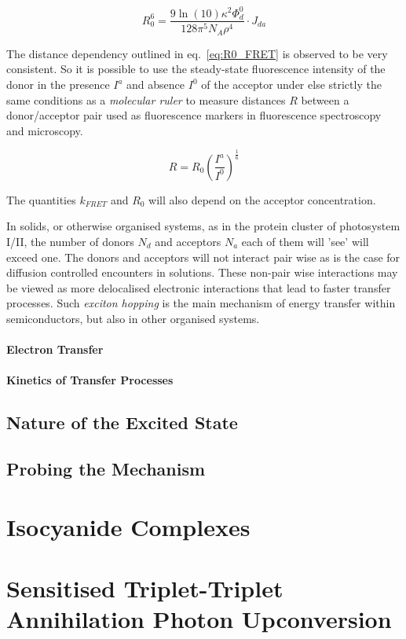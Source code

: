 			\begin{equation}
				\label{eq:R0_FRET}
				R^6_0 = \frac{9\ln(10)\kappa^2\Phi^0_d}{128\pi^5 N_A\rho^4}\cdot J_{da}
			\end{equation}

			The distance dependency outlined in eq.~\ref{eq:R0_FRET} is observed to be very consistent. So it is possible to use the steady-state fluorescence intensity of the donor in the presence $I^a$ and absence $I^0$ of the acceptor under else strictly the same conditions as a \emph{molecular ruler} to measure distances $R$ between a donor/acceptor pair used as fluorescence markers in fluorescence spectroscopy and microscopy.

			\begin{equation}
				R = R_0 \left(\frac{I^a}{I^0}\right)^{\frac{1}{6}}
			\end{equation}

			The quantities $k_{FRET}$ and $R_0$ will also depend on the acceptor concentration.

			In solids, or otherwise organised systems, as in the protein cluster of photosystem I/II, the number of donors $N_d$ and acceptors $N_a$ each of them will 'see' will exceed one. The donors and acceptors will not interact pair wise as is the case for  diffusion controlled encounters in solutions. These non-pair wise interactions may be viewed as more delocalised electronic interactions that lead to faster transfer processes. Such \emph{exciton hopping} is the main mechanism of energy transfer within semiconductors, but also in other organised systems.

			\subsubsection{Electron Transfer}

			\subsubsection{Kinetics of Transfer Processes}
	
	\section{Nature of the Excited State}	
	\label{sec:nature}	 



	\section{Probing the Mechanism} 

	
	\label{sec:mechanism}
			

\chapter{Isocyanide Complexes}

\chapter{Sensitised Triplet-Triplet Annihilation Photon Upconversion}